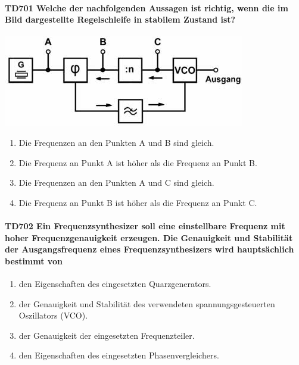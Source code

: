 \documentclass[8pt]{article}
\begin{document}
\begin{enumerate}
\begin{enumerate}[nolistsep,label=\Alph*]
\paragraph*{TD701 Welche der nachfolgenden Aussagen ist richtig, wenn die im Bild dargestellte Regelschleife in stabilem Zustand ist?}
\begin{center}
	\begin{minipage}{\linewidth}
		\centering
		\includegraphics[scale=1.0]{pics/td701_a.jpg}
	\end{minipage}
\end{center}
\begin{enumerate}[nolistsep,label=\Alph*]
\item Die Frequenzen an den Punkten A und B sind gleich.
\item Die Frequenz an Punkt A ist höher als die Frequenz an Punkt B.
\item Die Frequenzen an den Punkten A und C sind gleich.
\item Die Frequenz an Punkt B ist höher als die Frequenz an Punkt C.
\end{enumerate}

\paragraph*{TD702 Ein Frequenzsynthesizer soll eine einstellbare Frequenz mit hoher Frequenzgenauigkeit erzeugen. Die Genauigkeit und Stabilität der Ausgangsfrequenz eines Frequenzsynthesizers wird hauptsächlich bestimmt von}
\begin{enumerate}[nolistsep,label=\Alph*]
\item den Eigenschaften des eingesetzten Quarzgenerators.
\item der Genauigkeit und Stabilität des verwendeten spannungsgesteuerten Oszillators (VCO).
\item der Genauigkeit der eingesetzten Frequenzteiler.
\item den Eigenschaften des eingesetzten Phasenvergleichers.
\end{enumerate}


\end{enumerate}
\end{enumerate}
\end{document}
